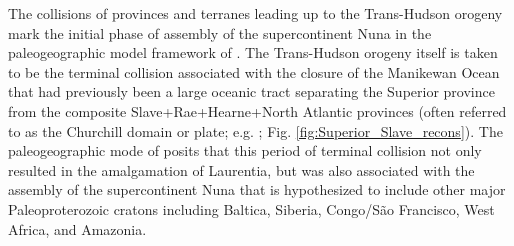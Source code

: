 \documentclass[11pt,letterpaper]{article}
\begin{document}
The collisions of provinces and terranes leading up to the Trans-Hudson orogeny mark the initial phase of assembly of the supercontinent Nuna in the paleogeographic model framework of \cite{Pehrsson2015a}. The Trans-Hudson orogeny itself is taken to be the terminal collision associated with the closure of the Manikewan Ocean that had previously been a large oceanic tract separating the Superior province from the composite Slave+Rae+Hearne+North Atlantic provinces (often referred to as the Churchill domain or plate; e.g. \citealp{Skipton2016a, Weller2017a}; Fig. \ref{fig:Superior_Slave_recons}). The paleogeographic mode of \cite{Pehrsson2015a} posits that this period of terminal collision not only resulted in the amalgamation of Laurentia, but was also associated with the assembly of the supercontinent Nuna that is hypothesized to include other major Paleoproterozoic cratons including Baltica, Siberia, Congo/S\~ao Francisco, West Africa, and Amazonia. 
\end{document}
